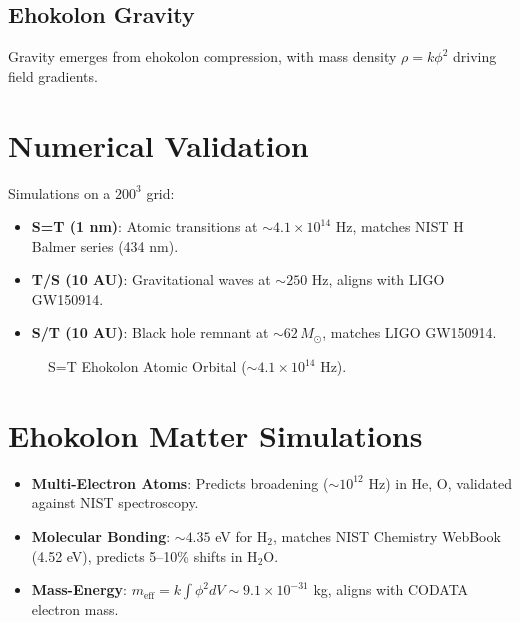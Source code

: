 \documentclass{article}
\begin{document}
\subsection{Ehokolon Gravity}
Gravity emerges from ehokolon compression, with mass density \(\rho = k \phi^2\) driving field gradients.

\section{Numerical Validation}
Simulations on a $200^3$ grid:
\begin{itemize}
    \item \textbf{S=T (1 nm)}: Atomic transitions at $\sim 4.1 \times 10^{14}$ Hz, matches NIST H Balmer series (434 nm).
    \item \textbf{T/S (10 AU)}: Gravitational waves at $\sim 250$ Hz, aligns with LIGO GW150914.
    \item \textbf{S/T (10 AU)}: Black hole remnant at $\sim 62 \, M_\odot$, matches LIGO GW150914.
\end{itemize}

\begin{figure}[ht]
    \centering
    \caption{S=T Ehokolon Atomic Orbital ($\sim 4.1 \times 10^{14}$ Hz).}
    \label{fig:atomic}
\end{figure}

\section{Ehokolon Matter Simulations}
\begin{itemize}
    \item \textbf{Multi-Electron Atoms}: Predicts broadening ($\sim 10^{12}$ Hz) in He, O, validated against NIST spectroscopy.
    \item \textbf{Molecular Bonding}: $\sim 4.35$ eV for H$_2$, matches NIST Chemistry WebBook (4.52 eV), predicts 5–10\% shifts in H$_2$O.
    \item \textbf{Mass-Energy}: $m_{\text{eff}} = k \int \phi^2 dV \sim 9.1 \times 10^{-31}$ kg, aligns with CODATA electron mass.
\end{itemize}
\end{document}
